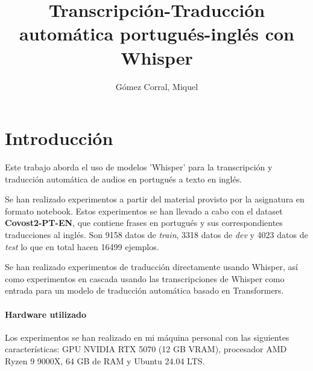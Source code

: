 \documentclass[11pt,spanish,listoffigures,listoftables]{tfgetsinf}
\title{Transcripción-Traducción automática portugués-inglés con Whisper}
\author{Gómez Corral, Miquel}
\begin{document}
 









\mainmatter

\chapter{Introducción}
Este trabajo aborda el uso de modelos 'Whisper' \cite{radford2023robust} para la transcripción y traducción automática de audios en portugués a texto en inglés. 

Se han realizado experimentos a partir del material provisto por la asignatura en formato notebook. Estos experimentos se han llevado a cabo con el dataset \textbf{Covost2-PT-EN}, que contiene frases en portugués y sus correspondientes traducciones al inglés. Son 9158 datos de \textit{train}, 3318 datos de \textit{dev} y 4023 datos de \textit{test} lo que en total hacen 16499 ejemplos.

Se han realizado experimentos de traducción directamente usando Whisper, así como experimentos en cascada usando las transcripciones de Whisper como entrada para un modelo de traducción automática basado en Transformers.


\subsubsection{Hardware utilizado}
Los experimentos se han realizado en mi máquina personal con las siguientes características: GPU NVIDIA RTX 5070 (12 GB VRAM), procesador AMD Ryzen 9 9000X, 64 GB de RAM y Ubuntu 24.04 LTS.
\end{document}
